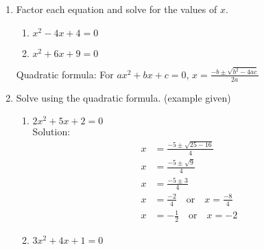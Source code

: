 \documentclass[12pt, twoside]{article}
\begin{document}
\begin{enumerate}
        \item Factor each equation and solve for the values of $x$.
        \begin{multicols}{2}
          \begin{enumerate}[itemsep=5cm]
          \item $x^2-4x+4=0$
          \item $x^2+6x+9=0$
        \end{enumerate}
        \end{multicols} \vspace{5cm}

      Quadratic formula: For $ax^2+bx+c=0$, $\displaystyle x=\frac{-b \pm \sqrt{b^2-4ac}}{2a}$
      \item Solve using the quadratic formula. (example given)
      \begin{multicols}{2}
        \begin{enumerate}[itemsep=5cm]
          \item $2x^2 + 5x + 2 = 0$ \\[0.5cm]
          Solution:
            \begin{align*}
              x &= \frac{-5 \pm \sqrt{25 - 16}}{4} \\
              x &= \frac{-5 \pm \sqrt{9}}{4} \\
              x &= \frac{-5 \pm 3}{4} \\
              x &= \frac{-2}{4} \quad \text{or} \quad x = \frac{-8}{4} \\
              x &= -\frac{1}{2} \quad \text{or} \quad x = -2
            \end{align*}
           \item $3x^2 + 4x + 1 = 0$
        \end{enumerate}
        \end{multicols} \vspace{4cm}


\end{enumerate}
\end{document}
